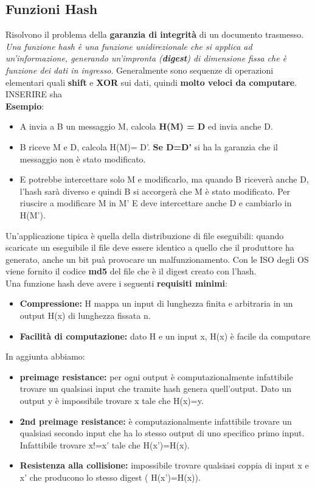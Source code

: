 \documentclass[12pt]{article}
\begin{document}
		\subsection{Funzioni Hash}
			Risolvono il problema della \textbf{garanzia di integrità} di un documento trasmesso. \\
			\textit{Una funzione hash è una funzione unidirezionale che si applica ad un'informazione, generando un'impronta (\textbf{digest}) di dimensione fissa che è funzione dei dati in ingresso}. Generalmente sono sequenze di operazioni elementari quali \textbf{shift} e \textbf{XOR} sui dati, quindi \textbf{molto veloci da computare}.\\
			
			INSERIRE sha\\
			
			\textbf{Esempio}:
			\begin{itemize}
				\item A invia a B un messaggio M, calcola \textbf{H(M) = D} ed invia anche D.
				\item B riceve M e D, calcola H(M)= D'.\textbf{ Se D=D'} si ha la garanzia che il messaggio non è stato modificato.
				\item E potrebbe intercettare solo M e modificarlo, ma quando B riceverà anche D, l'hash sarà diverso e quindi B si accorgerà che M è stato modificato. Per riuscire a modificare M in M' E deve intercettare anche D e cambiarlo in H(M').
			\end{itemize}
			Un'applicazione tipica è quella della distribuzione di file eseguibili: quando scaricate un eseguibile il file deve essere identico a quello che il produttore ha generato, anche un bit puà provocare un malfunzionamento. Con le ISO degli OS viene fornito il codice \textbf{md5} del file che è il digest creato con l'hash. \\
			Una funzione hash deve avere i seguenti \textbf{requisiti minimi}:
			\begin{itemize}
				\item \textbf{Compressione:} H mappa un input di lunghezza finita e arbitraria in un output H(x) di lunghezza fissata n.
				\item \textbf{Facilità di computazione:} dato H e un input x, H(x) è facile da computare 
			\end{itemize}
			In aggiunta abbiamo:
			\begin{itemize}
				\item \textbf{preimage resistance:} per ogni output è computazionalmente infattibile trovare un qualsiasi input che tramite hash genera quell'output. Dato un output y è impossibile trovare x tale che H(x)=y.
				\item \textbf{2nd preimage resistance:} è computazionalmente infattibile trovare un qualsiasi secondo input che ha lo stesso output di uno specifico primo input. Infattibile trovare x!=x' tale che H(x')=H(x).
				\item \textbf{Resistenza alla collisione:} impossibile trovare qualsiasi coppia di input x e x' che producono lo stesso digest ( H(x')=H(x)).
			\end{itemize}
\end{document}
